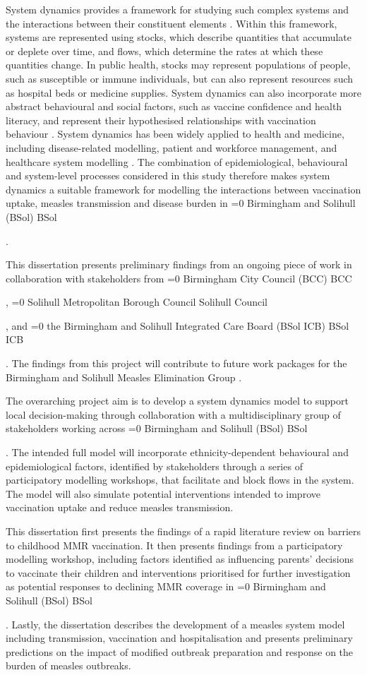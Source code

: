 \documentclass[12pt]{article}
\newcounter{bcc}
\newcommand{\bcc}{%
    \ifnum\value{bcc}=0
        \stepcounter{bcc}%
        Birmingham City Council (BCC)%
        \else
        BCC%
    \fi%
    \xspace
}
\newcounter{bsol}
\newcommand{\bsol}{%
    \ifnum\value{bsol}=0
        \stepcounter{bsol}%
        Birmingham and Solihull (BSol)%
        \else
        BSol%
    \fi%
    \xspace
}
\newcounter{solihull}
\newcommand{\solihull}{%
    \ifnum\value{solihull}=0
        \stepcounter{bcc}%
        Solihull Metropolitan Borough Council%
    \else
        Solihull Council%
    \fi%
    \xspace
}
\newcounter{ukhsa}
\newcounter{bsolicb}
\newcommand{\bsolicb}{%
    \ifnum\value{bsolicb}=0
        \stepcounter{bsolicb}%
        the Birmingham and Solihull Integrated Care Board (BSol ICB)%
    \else
        BSol ICB%
    \fi%
    \xspace
}
\begin{document}
System dynamics provides a framework for studying such complex systems and the interactions between their constituent elements \cite{bala2017system}. Within this framework, systems are represented using stocks, which describe quantities that accumulate or deplete over time, and flows, which determine the rates at which these quantities change. In public health, stocks may represent populations of people, such as susceptible or immune individuals, but can also represent resources such as hospital beds or medicine supplies. System dynamics can also incorporate more abstract behavioural and social factors, such as vaccine confidence and health literacy, and represent their hypothesised relationships with vaccination behaviour \cite{van2020explaining}. System dynamics has been widely applied to health and medicine, including disease-related modelling, patient and workforce management, and healthcare system modelling \cite{darabi2020system, davahli2020system, homer2006system}. The combination of epidemiological, behavioural and system-level processes considered in this study therefore makes system dynamics a suitable framework for modelling the interactions between vaccination uptake, measles transmission and disease burden in \bsol.

This dissertation presents preliminary findings from an ongoing piece of work in collaboration with stakeholders from \bcc, \solihull, and \bsolicb. The findings from this project will contribute to future work packages for the Birmingham and Solihull Measles Elimination Group \cite{ukhsa_measles_briefing_2026}.

The overarching project aim is to develop a system dynamics model to support local decision-making through collaboration with a multidisciplinary group of stakeholders working across \bsol. The intended full model will incorporate ethnicity-dependent behavioural and epidemiological factors, identified by stakeholders through a series of participatory modelling workshops, that facilitate and block flows in the system. The model will also simulate potential interventions intended to improve vaccination uptake and reduce measles transmission.

This dissertation first presents the findings of a rapid literature review on barriers to childhood MMR vaccination. It then presents findings from a participatory modelling workshop, including factors identified as influencing parents' decisions to vaccinate their children and interventions prioritised for further investigation as potential responses to declining MMR coverage in \bsol. Lastly, the dissertation describes the development of a measles system model including transmission, vaccination and hospitalisation and presents preliminary predictions on the impact of modified outbreak preparation and response on the burden of measles outbreaks. 
\end{document}
